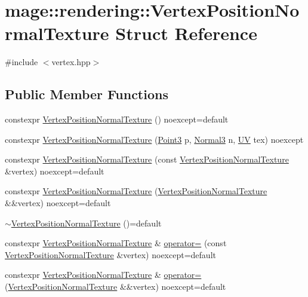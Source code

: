 \hypertarget{structmage_1_1rendering_1_1_vertex_position_normal_texture}{}\section{mage\+:\+:rendering\+:\+:Vertex\+Position\+Normal\+Texture Struct Reference}
\label{structmage_1_1rendering_1_1_vertex_position_normal_texture}


{\ttfamily \#include $<$vertex.\+hpp$>$}

\subsection*{Public Member Functions}
\begin{DoxyCompactItemize}
\item 
constexpr \mbox{\hyperlink{structmage_1_1rendering_1_1_vertex_position_normal_texture_a9ddc1e28f0e4c893d9dca5fa776d68fe}{Vertex\+Position\+Normal\+Texture}} () noexcept=default
\item 
constexpr \mbox{\hyperlink{structmage_1_1rendering_1_1_vertex_position_normal_texture_a7cb8ef7c0852f680e149dc24d8ae3f12}{Vertex\+Position\+Normal\+Texture}} (\mbox{\hyperlink{structmage_1_1_point3}{Point3}} p, \mbox{\hyperlink{structmage_1_1_normal3}{Normal3}} n, \mbox{\hyperlink{structmage_1_1_u_v}{UV}} tex) noexcept
\item 
constexpr \mbox{\hyperlink{structmage_1_1rendering_1_1_vertex_position_normal_texture_adcff35e1a3653f739b68c10ead5c33da}{Vertex\+Position\+Normal\+Texture}} (const \mbox{\hyperlink{structmage_1_1rendering_1_1_vertex_position_normal_texture}{Vertex\+Position\+Normal\+Texture}} \&vertex) noexcept=default
\item 
constexpr \mbox{\hyperlink{structmage_1_1rendering_1_1_vertex_position_normal_texture_a93576bdd7233682f8758a187a6958428}{Vertex\+Position\+Normal\+Texture}} (\mbox{\hyperlink{structmage_1_1rendering_1_1_vertex_position_normal_texture}{Vertex\+Position\+Normal\+Texture}} \&\&vertex) noexcept=default
\item 
\mbox{\hyperlink{structmage_1_1rendering_1_1_vertex_position_normal_texture_ad776aa49c8bb1ec6bb0468eacd85feac}{$\sim$\+Vertex\+Position\+Normal\+Texture}} ()=default
\item 
constexpr \mbox{\hyperlink{structmage_1_1rendering_1_1_vertex_position_normal_texture}{Vertex\+Position\+Normal\+Texture}} \& \mbox{\hyperlink{structmage_1_1rendering_1_1_vertex_position_normal_texture_ab41cec4ed6c1a38cd4bc5c73e78ec747}{operator=}} (const \mbox{\hyperlink{structmage_1_1rendering_1_1_vertex_position_normal_texture}{Vertex\+Position\+Normal\+Texture}} \&vertex) noexcept=default
\item 
constexpr \mbox{\hyperlink{structmage_1_1rendering_1_1_vertex_position_normal_texture}{Vertex\+Position\+Normal\+Texture}} \& \mbox{\hyperlink{structmage_1_1rendering_1_1_vertex_position_normal_texture_a16913ccdaec3d1a0a67b4ba33cc7b7d1}{operator=}} (\mbox{\hyperlink{structmage_1_1rendering_1_1_vertex_position_normal_texture}{Vertex\+Position\+Normal\+Texture}} \&\&vertex) noexcept=default
\end{DoxyCompactItemize}
